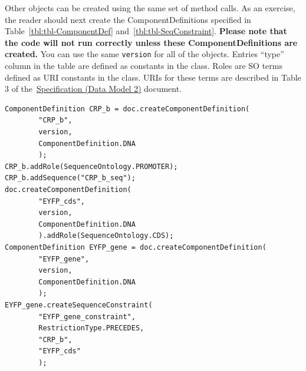 Other  objects can be created using the same set of method calls. As an exercise, the reader should next create the ComponentDefinitions specified in Table~\ref{tbl:tbl-ComponentDef} and~\ref{tbl:tbl-SeqConstraint}. \textbf{Please note that the code will not run correctly unless these ComponentDefinitions are created.} You can use the same \lstinline+version+ for all of the  objects. Entries ``type'' column in the table are defined as constants in the  class. Roles are SO terms defined as URI constants in the  class. URIs for these terms are described in Table 3 of the~\href{http://sbolstandard.org/downloads/specification-data-model-2-0/}{Specification  (Data Model 2)} document.

\vspace{\abovedisplayskip}
\begin{minipage}{0.95\textwidth}
\begin{lstlisting}
ComponentDefinition CRP_b = doc.createComponentDefinition(
        "CRP_b",
        version, 
        ComponentDefinition.DNA
        );
CRP_b.addRole(SequenceOntology.PROMOTER);
CRP_b.addSequence("CRP_b_seq");
doc.createComponentDefinition(
        "EYFP_cds", 
        version, 
        ComponentDefinition.DNA
        ).addRole(SequenceOntology.CDS);
ComponentDefinition EYFP_gene = doc.createComponentDefinition(
        "EYFP_gene", 
        version, 
        ComponentDefinition.DNA
        );
EYFP_gene.createSequenceConstraint(
        "EYFP_gene_constraint", 
        RestrictionType.PRECEDES, 
        "CRP_b", 
        "EYFP_cds"
        );
\end{lstlisting}
\end{minipage}

